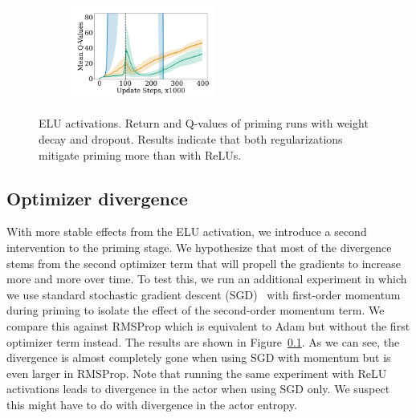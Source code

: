 \begin{figure}[H]
\begin{minipage}[b]{.62\textwidth}
\begin{subfigure}[b]{0.5\textwidth}
        \label{subfig:elu_priming_abl_ret}
    \end{subfigure}%
    \begin{subfigure}[b]{0.5\textwidth}
    \centering
        \includegraphics[width=4.8cm, trim=1cm 1cm 1cm 1cm ,clip]{figures/dissecting/priming/elu_priming_ablations_Q.pdf}
        \label{subfig:elu_priming_abl_Q}
    \end{subfigure}%
    \vspace{-18pt}
    \caption{ELU activations. Return and
    Q-values of priming runs with weight decay and dropout. Results indicate that both regularizations mitigate priming more than with ReLUs. }
    \label{fig:elu_priming_abl}
\end{minipage}
    \vspace{-5pt}
\end{figure}

\subsection{Optimizer divergence} \label{app:priming_opt}

With more stable effects from the ELU activation, we introduce a second intervention to the priming stage. We hypothesize that most of the divergence stems from the second optimizer term that will propell the gradients to increase more and more over time. To test this, we run an additional experiment in which we use standard stochastic gradient descent (SGD)~\parencite{robbins1951stochastic} with first-order momentum~\parencite{rumelhart1986learning, sutskever2013on} during priming to isolate the effect of the second-order momentum term. We compare this against RMSProp which is equivalent to Adam but without the first optimizer term instead. The results are shown in Figure~\ref{app:priming_opt}. As we can see, the divergence is almost completely gone when using SGD with momentum but is even larger in RMSProp. Note that running the same experiment with ReLU activations  leads to divergence in the actor when using SGD only. We suspect this might have to do with divergence in the actor entropy.


